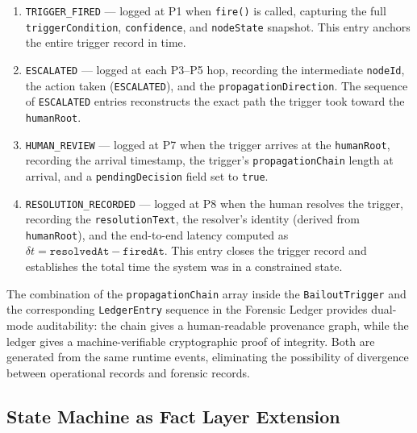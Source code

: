 \begin{enumerate}
  \item \texttt{TRIGGER\_FIRED} --- logged at P1 when \texttt{fire()} is called,
        capturing the full \texttt{triggerCondition}, \texttt{confidence}, and
        \texttt{nodeState} snapshot.  This entry anchors the entire trigger record
        in time.

  \item \texttt{ESCALATED} --- logged at each P3--P5 hop, recording the intermediate
        \texttt{nodeId}, the action taken (\texttt{ESCALATED}), and the
        \texttt{propagationDirection}.  The sequence of \texttt{ESCALATED} entries
        reconstructs the exact path the trigger took toward the \texttt{humanRoot}.

  \item \texttt{HUMAN\_REVIEW} --- logged at P7 when the trigger arrives at the
        \texttt{humanRoot}, recording the arrival timestamp, the trigger's
        \texttt{propagationChain} length at arrival, and a \texttt{pendingDecision}
        field set to \texttt{true}.

  \item \texttt{RESOLUTION\_RECORDED} --- logged at P8 when the human resolves the
        trigger, recording the \texttt{resolutionText}, the resolver's identity
        (derived from \texttt{humanRoot}), and the end-to-end latency computed as
        $\delta t = \texttt{resolvedAt} - \texttt{firedAt}$.  This entry closes the
        trigger record and establishes the total time the system was in a
        constrained state.
\end{enumerate}

The combination of the \texttt{propagationChain} array inside the \texttt{BailoutTrigger}
and the corresponding \texttt{LedgerEntry} sequence in the Forensic Ledger provides
dual-mode auditability: the chain gives a human-readable provenance graph, while the
ledger gives a machine-verifiable cryptographic proof of integrity.  Both are generated
from the same runtime events, eliminating the possibility of divergence between
operational records and forensic records.

\subsection{State Machine as Fact Layer Extension}
\label{sec:state-machine}

